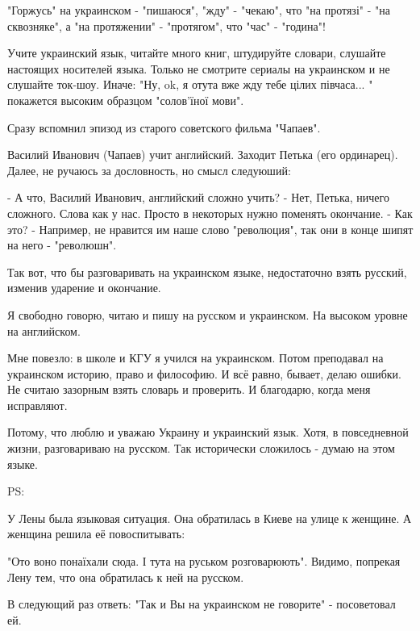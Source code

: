 "Горжусь" на украинском - "пишаюся", "жду" - "чекаю", что "на протязі" - "на
сквозняке", а "на протяжении" - "протягом", что "час" - "година"! 

Учите украинский язык, читайте много книг, штудируйте словари, слушайте
настоящих носителей языка. Только не смотрите сериалы на украинском и не
слушайте ток-шоу. Иначе: "Ну, ok, я отута вже жду тебе цілих півчаса... "
покажется высоким образцом "солов'їної мови". 

Сразу вспомнил эпизод из старого советского фильма "Чапаев". 

Василий Иванович (Чапаев) учит английский. Заходит Петька (его ординарец).
Далее, не ручаюсь за дословность, но смысл следуюший:

- А что, Василий Иванович, английский сложно учить? 
- Нет, Петька, ничего сложного. Слова как у нас. Просто в некоторых нужно поменять окончание. 
- Как это? 
- Например, не нравится им наше слово "революция", так они в конце шипят на него - "революшн". 

Так вот, что бы разговаривать на украинском языке, недостаточно взять русский,
изменив ударение и окончание. 

Я свободно говорю, читаю и пишу на русском и украинском. На высоком уровне на
английском. 

Мне повезло: в школе и КГУ я учился на украинском. Потом преподавал на
украинском историю, право и философию. И всё равно, бывает, делаю ошибки. Не
считаю зазорным взять словарь и проверить. И благодарю, когда меня исправляют.

Потому, что люблю и уважаю Украину и украинский язык. Хотя, в повседневной
жизни, разговариваю на русском. Так исторически сложилось - думаю на этом
языке. 

PS:

У Лены была языковая ситуация. Она обратилась в Киеве на улице к женщине. А
женщина решила её повоспитывать:

"Ото воно понаїхали сюда. І тута на руськом розговарюють". Видимо, попрекая
Лену тем, что она обратилась к ней на русском. 

В следующий раз ответь: "Так и Вы на украинском не говорите" - посоветовал ей.
